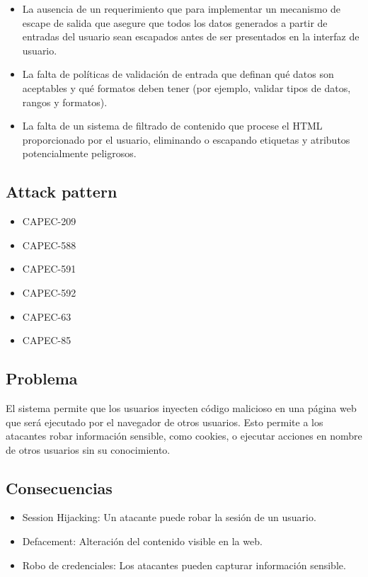 \begin{itemize}
    \item La ausencia de un requerimiento que para implementar un mecanismo de escape de salida que asegure que todos los datos generados a partir de entradas del usuario sean escapados antes de ser presentados en la interfaz de usuario.
    \item La falta de políticas de validación de entrada que definan qué datos son aceptables y qué formatos deben tener (por ejemplo, validar tipos de datos, rangos y formatos).
    \item La falta de un sistema de filtrado de contenido que procese el HTML proporcionado por el usuario, eliminando o escapando etiquetas y atributos potencialmente peligrosos.
\end{itemize}

\subsection*{Attack pattern}
\begin{itemize}
    \item CAPEC-209
    \item CAPEC-588
    \item CAPEC-591
    \item CAPEC-592
    \item CAPEC-63
    \item CAPEC-85
\end{itemize}

\subsection*{Problema}

El sistema permite que los usuarios inyecten código malicioso en una página web que será ejecutado por el navegador de otros usuarios. Esto permite a los atacantes robar información sensible, como cookies, o ejecutar acciones en nombre de otros usuarios sin su conocimiento.

\subsection*{Consecuencias}

\begin{itemize}
    \item Session Hijacking: Un atacante puede robar la sesión de un usuario.
    \item Defacement: Alteración del contenido visible en la web.
    \item Robo de credenciales: Los atacantes pueden capturar información sensible.
\end{itemize}

